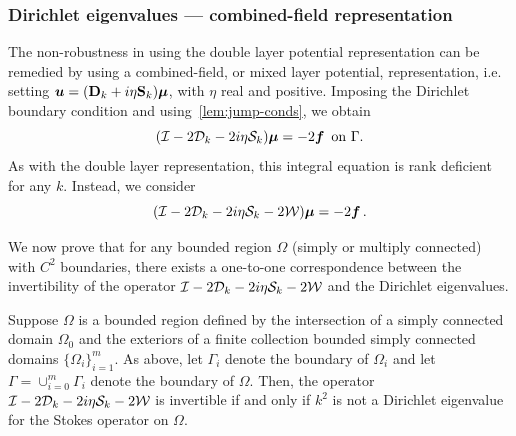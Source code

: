 \subsubsection{Dirichlet eigenvalues --- combined-field representation}
\label{subsec:mixedanalysis}

The non-robustness in using the double layer
potential representation can be
remedied by using a combined-field, or mixed layer potential,
representation, i.e. setting ${\boldsymbol u} = ({\bf D}_{k} + i\eta {\bf S}_{k})
{\boldsymbol \mu}$, with $\eta$ real and positive.
Imposing the Dirichlet boundary condition
and using~\cref{lem:jump-conds}, we obtain 
\begin{equation}
  (\mathcal I - 2{\mathcal D}_{k} - 2i\eta {\mathcal S}_{k}) {\boldsymbol \mu} = -2 {\boldsymbol f} \,
  \textrm{ on } \Gamma. 
\end{equation}
As with the double layer representation, this
integral equation is rank deficient for any $k$.
Instead, we consider
\begin{equation}
(\mathcal I - 2{\mathcal D}_{k} -2i\eta {\mathcal S}_{k}  -2{\mathcal W}){\boldsymbol \mu} = -2 {\boldsymbol f} \, .
\end{equation}

We now prove that for any bounded region $\Omega$
(simply or multiply connected) with $C^{2}$ boundaries,
there exists a one-to-one correspondence between the
invertibility of the operator $\mathcal I - 2{\mathcal D}_{k}
- 2i\eta {\mathcal S}_{k} - 2{\mathcal W}$ and the Dirichlet eigenvalues.

\begin{thrm}
  \label{thm:cfmain}
  Suppose $\Omega$ is a bounded region defined
  by the intersection of a simply connected domain $\Omega_{0}$
  and the exteriors of a finite collection bounded simply
  connected domains $\{ \Omega_{i} \}_{i=1}^{m}$. As above,
  let $\Gamma_{i}$ denote the boundary of $\Omega_{i}$ and let
  $\Gamma = \cup_{i=0}^{m} \Gamma_{i}$ denote the boundary of
  $\Omega$. Then, the operator $\mathcal I - 2{\mathcal D}_{k} - 2i\eta {\mathcal S}_{k}
  - 2{\mathcal W}$ is invertible if and only if $k^2$ is not a Dirichlet
  eigenvalue for the Stokes operator on $\Omega$.
\end{thrm}

